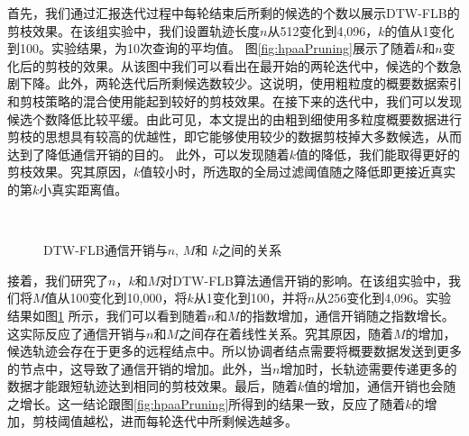   首先，我们通过汇报迭代过程中每轮结束后所剩的候选的个数以展示DTW-FLB的剪枝效果。在该组实验中，我们设置轨迹长度$n$从512变化到4,096，$k$的值从1变化到100。实验结果，为10次查询的平均值。
  图\ref{fig:hpaaPruning}展示了随着$k$和$n$变化后的剪枝的效果。从该图中我们可以看出在最开始的两轮迭代中，候选的个数急剧下降。此外，两轮迭代后所剩候选数较少。这说明，使用粗粒度的概要数据索引和剪枝策略的混合使用能起到较好的剪枝效果。在接下来的迭代中，我们可以发现候选个数降低比较平缓。由此可见，本文提出的由粗到细使用多粒度概要数据进行剪枝的思想具有较高的优越性，即它能够使用较少的数据剪枝掉大多数候选，从而达到了降低通信开销的目的。
  此外，可以发现随着$k$值的降低，我们能取得更好的剪枝效果。究其原因，$k$值较小时，所选取的全局过滤阈值随之降低即更接近真实的第$k$小真实距离值。
  
  \begin{figure}[t]
  	\centering
  \\
  	\caption{DTW-FLB通信开销与$n$, $M$和 $k$之间的关系}
  	\label{fig:hpaaKMn}
  \end{figure}
  
  接着，我们研究了$n$，$k$和$M$对DTW-FLB算法通信开销的影响。在该组实验中，我们将$M$值从100变化到10,000，将$k$从1变化到100，并将$n$从256变化到4,096。实验结果如图\ref{fig:hpaaKMn} 所示，我们可以看到随着$n$和$M$的指数增加，通信开销随之指数增长。这实际反应了通信开销与$n$和$M$之间存在着线性关系。究其原因，随着$M$的增加，候选轨迹会存在于更多的远程结点中。所以协调者结点需要将概要数据发送到更多的节点中，这导致了通信开销的增加。此外，当$n$增加时，长轨迹需要传递更多的数据才能跟短轨迹达到相同的剪枝效果。最后，随着$k$值的增加，通信开销也会随之增长。这一结论跟图\ref{fig:hpaaPruning}所得到的结果一致，反应了随着$k$的增加，剪枝阈值越松，进而每轮迭代中所剩候选越多。
  
